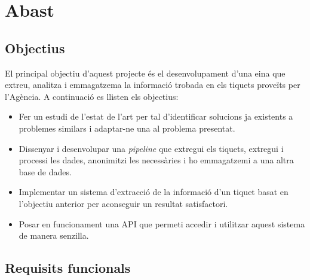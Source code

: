 \section{Abast}

\subsection{Objectius} \label{ssec:objectius}

El principal objectiu d'aquest projecte és el desenvolupament d'una eina que extreu, analitza i emmagatzema la informació trobada en els tiquets proveïts per l'Agència. A continuació es llisten els objectius:

\begin{itemize}
    \item Fer un estudi de l'estat de l'art per tal d'identificar solucions ja existents a problemes similars i adaptar-ne una al problema presentat.
    \item Dissenyar i desenvolupar una \textit{pipeline} que extregui els tiquets, extregui i processi les dades, anonimitzi les necessàries i ho emmagatzemi a una altra base de dades.     
    \item Implementar un sistema d'extracció de la informació d'un tiquet basat en l'objectiu anterior per aconseguir un resultat satisfactori.
    \item Posar en funcionament una API que permeti accedir i utilitzar aquest sistema de manera senzilla.
\end{itemize}


\subsection{Requisits funcionals}

